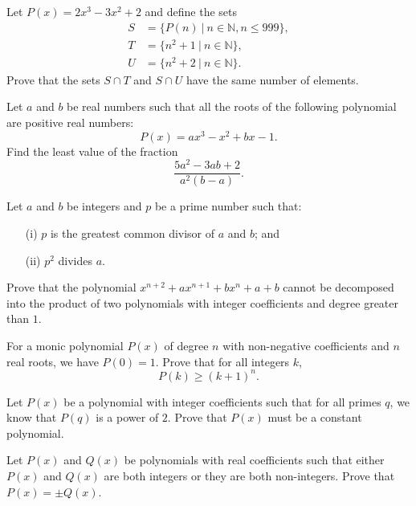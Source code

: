 \begin{question}[name={1999 Poland}]
    Let $P(x)=2x^3-3x^2+2$ and define the sets
    \begin{align*}
        S &= \{P(n) \ | \ n \in \mathbb N, n \leq 999\},\\
        T &= \{n^2+1 \ | \ n \in \mathbb N\},\\
        U &= \{n^2+2 \ | \ n \in \mathbb N\}.
    \end{align*}
    Prove that the sets $S \cap T$ and $S \cap U$ have the same number of elements.
\end{question}


\begin{question}[name={1999 Vietnam}]
    Let $a$ and $b$ be real numbers such that all the roots of the following polynomial are positive real numbers: \[P(x)=ax^3-x^2+bx-1.\]
    Find the least value of the fraction \[\frac{5a^2-3ab+2}{a^2(b-a)}.\]
\end{question}


\begin{question}[name={1995 Korea}]
    Let $a$ and $b$ be integers and $p$ be a prime number such that:
    \begin{itemize}
        \item[(i)] $p$ is the greatest common divisor of $a$ and $b$; and
        \item[(ii)] $p^2$ divides $a$.
    \end{itemize}
    Prove that the polynomial $x^{n+2}+ax^{n+1}+bx^{n}+a+b$ cannot be decomposed into the product of two polynomials with integer coefficients and degree greater than $1$.
\end{question}


\begin{question}
    For a monic polynomial $P(x)$ of degree $n$ with non-negative coefficients and $n$ real roots, we have $P(0)=1$. Prove that for all integers $k$, \[P(k) \geq (k+1)^n.\]
\end{question}


\begin{question}
    Let $P(x)$ be a polynomial with integer coefficients such that for all primes $q$, we know that $P(q)$ is a power of $2$. Prove that $P(x)$ must be a constant polynomial.
\end{question}


\begin{question}
    Let $P(x)$ and $Q(x)$ be polynomials with real coefficients such that either $P(x)$ and $Q(x)$ are both integers or they are both non-integers. Prove that $P(x) = \pm Q(x)$.
\end{question}


